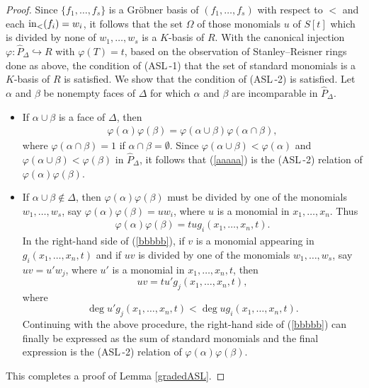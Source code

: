 \documentclass[12pt]{amsart}
\begin{document}
\begin{proof}
Since $\{f_1, \ldots, f_s\}$ is a Gr\"obner basis of $(f_1, \ldots, f_s)$ with respect to $<$ and each ${\rm in}_<(f_i) = w_i$, it follows that the set $\Omega$ of those monomials $u$ of $S[t]$ which is divided by none of $w_1, \ldots, w_s$ is a $K$-basis of $R$.  With the canonical injection $\varphi:\hat{P}_\Delta \hookrightarrow R$ with $\varphi(T) = t$, based on the observation of Stanley--Reisner rings done as above, the condition of (ASL\,-1) that the set of standard monomials is a $K$-basis of $R$ is satisfied.  We show that the condition of (ASL\,-2) is satisfied.  Let $\alpha$ and $\beta$ be nonempty faces of $\Delta$ for which $\alpha$ and $\beta$ are incomparable in $\hat{P}_\Delta$.  
\begin{itemize}
    \item If $\alpha \cup \beta$ is a face of $\Delta$, then
\begin{eqnarray}
\label{aaaaa}
\varphi(\alpha)\varphi(\beta) = \varphi(\alpha \cup \beta) \varphi(\alpha \cap \beta),
\end{eqnarray}
where $\varphi(\alpha \cap \beta)=1$ if $\alpha \cap \beta = \emptyset$.  Since $\varphi(\alpha \cup \beta) < \varphi(\alpha)$ and $\varphi(\alpha \cup \beta) < \varphi(\beta)$ in $\hat{P}_\Delta$, it follows that (\ref{aaaaa}) is the (ASL\,-2) relation of $\varphi(\alpha)\varphi(\beta)$.
\item 
If $\alpha \cup \beta \not\in \Delta$, then $\varphi(\alpha)\varphi(\beta)$ must be divided by one of the monomials $w_1, \ldots, w_s$, say $\varphi(\alpha)\varphi(\beta) = uw_i$, where $u$ is a monomial in $x_1, \ldots, x_n$.  Thus
\begin{eqnarray}
\label{bbbbb}
\varphi(\alpha)\varphi(\beta) = t u g_i(x_1, \ldots, x_n, t).
\end{eqnarray}  
 In the right-hand side of (\ref{bbbbb}), if $v$ is a monomial appearing in $g_i(x_1, \ldots, x_n, t)$ and if $uv$ is divided by one of the monomials $w_1, \ldots, w_s$, say $uv=u'w_j$, where $u'$ is a monomial in $x_1, \ldots, x_n, t$, then 
 \[
 uv=tu'g_j(x_1, \ldots, x_n, t),
 \]
 where 
 \[
 \deg u'g_j(x_1, \ldots, x_n, t)< \deg ug_i(x_1, \ldots, x_n, t).  
 \]
 Continuing with the above procedure, the right-hand side of (\ref{bbbbb}) can finally be expressed as the sum of standard monomials and the final expression is the (ASL\,-2) relation of $\varphi(\alpha)\varphi(\beta)$.
\end{itemize}
This completes a proof of Lemma \ref{gradedASL}. 
\hspace{7cm}
\end{proof}
    
\end{document}
